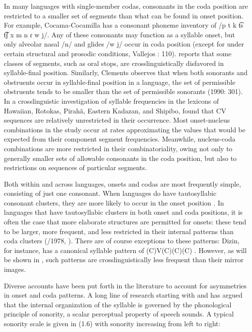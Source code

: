   In many languages with single-member codas, consonants in the coda position are restricted to a smaller set of segments than what can be found in onset position. For example, Cocama-Cocamilla has a consonant phoneme inventory of \textsf{/}p t k t͡s t͡ʃ x m n ɾ w j\textsf{/}. Any of these consonants may function as a syllable onset, but only alveolar nasal /n/ and glides /w j/ occur in coda position (except for under certain structural and prosodic conditions, Vallejos \citealt{Yopán2010}: 110). \citet{Krakow1999} reports that some classes of segments, such as oral stops, are crosslinguistically disfavored in syllable-final position. Similarly, Clements observes that when both sonorants and obstruents occur in syllable-final position in a language, the set of permissible obstruents tends to be smaller than the set of permissible sonorants (1990: 301). In a crosslinguistic investigation of syllable frequencies in the lexicons of Hawaiian, Rotokas, Pirahã, Eastern Kadazan, and Shipibo, \citet{MaddiesonPrecoda1992} found that CV sequences are relatively unrestricted in their occurrence. Most onset-nucleus combinations in the study occur at rates approximating the values that would be expected from their component segment frequencies. Meanwhile, nucleus-coda combinations are more restricted in their combinatoriality, owing not only to generally smaller sets of allowable consonants in the coda position, but also to restrictions on sequences of particular segments.

  Both within and across languages, onsets and codas are most frequently simple, consisting of just one consonant. When languages do have tautosyllabic consonant clusters, they are more likely to occur in the onset position \citep{Blevins2006}. In languages that have tautosyllabic clusters in both onset and coda positions, it is often the case that more elaborate structures are permitted for onsets: these tend to be larger, more frequent, and less restricted in their internal patterns than coda clusters (\citealt{Greenberg1965}/1978, \citealt{Blevins2006}). There are of course exceptions to these patterns: Dizin, for instance, has a canonical syllable pattern of (C)V(C)(C)(C) \citep{Beachy2005}. However, as will be shown in , such patterns are crosslinguistically less frequent than their mirror images.

  Diverse accounts have been put forth in the literature to account for asymmetries in onset and coda patterns. A long line of research starting with \citet{Sievers1881} and \citet{Jespersen1904} has argued that the internal organization of the syllable is governed by the phonological principle of sonority, a scalar perceptual property of speech sounds. A typical sonority scale is given in (1.6) with sonority increasing from left to right:

